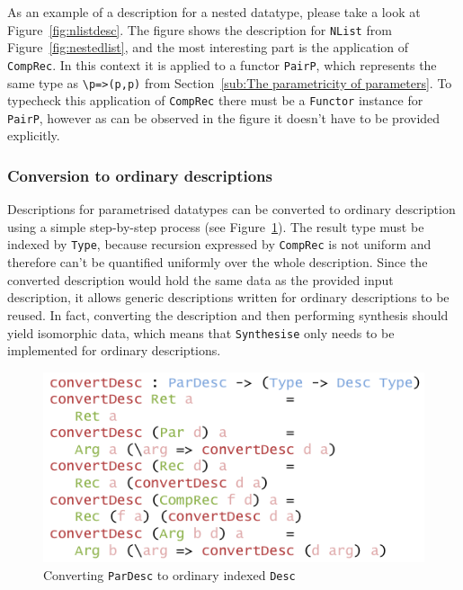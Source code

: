 \documentclass{ituthesis}
\newcommand{\ttconstructor}[1]{\textcolor{constructor-color}{\texttt{#1}}}
\newcommand{\tttype}[1]{\textcolor{type-color}{\texttt{#1}}}
\newcommand{\ttdec}[1]{\textcolor{declared-var-color}{\texttt{#1}}}
\newcommand{\ttvar}[1]{\textcolor{local-var-color}{\texttt{#1}}}
\theoremstyle{break}
\begin{document}
As an example of a description for a nested datatype, please take a look at Figure~\ref{fig:nlistdesc}.
The figure shows the description for \tttype{NList} from Figure~\ref{fig:nestedlist}, and the most interesting
part is the application of \ttconstructor{CompRec}.
In this context it is applied to a functor \ttdec{PairP}, which represents the same type as \texttt{\textbackslash}\ttvar{p}\texttt{=>}\tttype{(}\ttvar{p}\tttype{,}\ttvar{p}\tttype{)} from Section~\ref{sub:The parametricity of parameters}.
To typecheck this application of \ttconstructor{CompRec} there must be a \tttype{Functor} instance for \ttdec{PairP}, however as can be observed in the figure it doesn't have to be provided explicitly.

\subsubsection{Conversion to ordinary descriptions}
\label{ssub:Conversion to ordinary descriptions}

Descriptions for parametrised datatypes can be converted to ordinary description using a simple step-by-step process (see Figure~\ref{fig:pardesctodesc}).
The result type must be indexed by \tttype{Type}, because recursion expressed by \ttconstructor{CompRec} is not uniform and therefore can't be quantified uniformly over the whole description.
Since the converted description would hold the same data as the provided input description, it allows generic descriptions written for ordinary descriptions to be reused.
In fact, converting the description and then performing synthesis should yield isomorphic data, which means that \ttdec{Synthesise} only needs to be implemented for ordinary descriptions.

\begin{figure}[ht]
\begin{center}
    \includegraphics[scale=0.5]{Figures/ParDescriptionConversion.png}
\end{center}
\caption{Converting \tttype{ParDesc} to ordinary indexed \tttype{Desc}}
\label{fig:pardesctodesc}
\end{figure}
\end{document}
